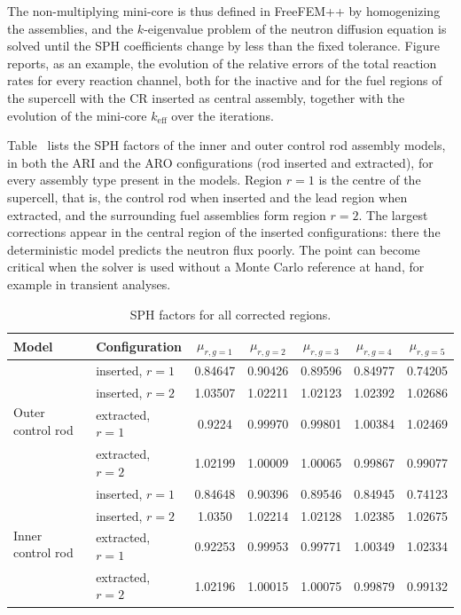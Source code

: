 %
The non-multiplying mini-core is thus defined in FreeFEM++ by homogenizing the assemblies, and the $k$-eigenvalue problem of the neutron diffusion equation is solved until the SPH coefficients change by less than the fixed tolerance. Figure~ reports, as an example, the evolution of the relative errors of the total reaction rates for every reaction channel, both for the inactive and for the fuel regions of the supercell with the CR inserted as central assembly, together with the evolution of the mini-core $k_{\mathrm{eff}}$ over the iterations.

Table~ lists the SPH factors of the inner and outer control rod assembly models, in both the ARI and the ARO configurations (rod inserted and extracted), for every assembly type present in the models. Region $r=1$ is the centre of the supercell, that is, the control rod when inserted and the lead region when extracted, and the surrounding fuel assemblies form region $r=2$. The largest corrections appear in the central region of the inserted configurations: there the deterministic model predicts the neutron flux poorly. The point can become critical when the solver is used without a Monte Carlo reference at hand, for example in transient analyses.


\begin{table}[h!]
\centering
\caption{SPH factors for all corrected regions.}
\label{sph:tab:SPH_factors}
\small
\setlength{\tabcolsep}{5pt}
\begin{tabular}{llccccc}
\toprule
Model & Configuration & $\mu_{r,g=1}$ & $\mu_{r,g=2}$ & $\mu_{r,g=3}$ & $\mu_{r,g=4}$ & $\mu_{r,g=5}$ \\
\midrule
\multirow{4}{*}{Outer control rod} & inserted, $r=1$  & 0.84647 & 0.90426 & 0.89596 & 0.84977 & 0.74205 \\
                                   & inserted, $r=2$  & 1.03507 & 1.02211 & 1.02123 & 1.02392 & 1.02686 \\
                                   & extracted, $r=1$ & 0.9224  & 0.99970 & 0.99801 & 1.00384 & 1.02469 \\
                                   & extracted, $r=2$ & 1.02199 & 1.00009 & 1.00065 & 0.99867 & 0.99077 \\
\midrule
\multirow{4}{*}{Inner control rod} & inserted, $r=1$  & 0.84648 & 0.90396 & 0.89546 & 0.84945 & 0.74123 \\
                                   & inserted, $r=2$  & 1.0350  & 1.02214 & 1.02128 & 1.02385 & 1.02675 \\
                                   & extracted, $r=1$ & 0.92253 & 0.99953 & 0.99771 & 1.00349 & 1.02334 \\
                                   & extracted, $r=2$ & 1.02196 & 1.00015 & 1.00075 & 0.99879 & 0.99132 \\
\bottomrule
\end{tabular}
\end{table}




